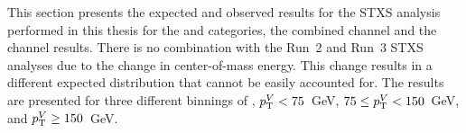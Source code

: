 This section presents the expected and observed results for the STXS analysis performed in this thesis for the \wh{} \zdom{} and \zdep{} categories, the combined \wh{} channel and the \zh{} channel results. There is no combination with the Run~2 and Run~3 STXS analyses due to the change in center-of-mass energy. This change results in a different expected \ptv{} distribution that cannot be easily accounted for. The results are presented for three different binnings of \ptv{}, $p_{\mathrm{T}}^{V} < 75$~GeV, $75 \leq p_{\mathrm{T}}^{V} < 150$~GeV, and $p_{\mathrm{T}}^{V} \geq 150$~GeV.
